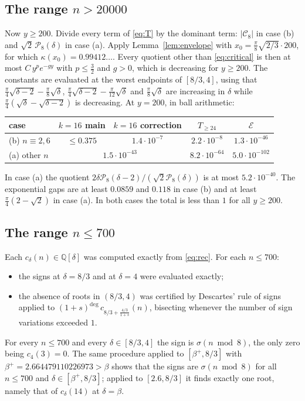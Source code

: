 \documentclass[11pt]{amsart}
\theoremstyle{remark}
\theoremstyle{definition}
\newcommand{\Q}{\mathbb Q}
\newcommand{\cP}{\mathcal P}
\newcommand{\cE}{\mathcal E}
\begin{document}
\subsection{The range \texorpdfstring{$n>20000$}{n > 20000}}\label{sec:tail}
Now $y\ge200$. Divide every term of \eqref{eq:T} by the dominant term: $|\mathcal C_8|$ in case (b) and $\sqrt2\,\cP_8(\delta)$ in case (a). Apply Lemma~\ref{lem:envelope} with $x_0=\frac\pi8\sqrt{2/3}\cdot200$, for which $\kappa(x_0)=0.99412\ldots$. Every quotient other than \eqref{eq:critical} is then at most $C\,y^pe^{-gy}$ with $p\le\frac32$ and $g>0$, which is decreasing for $y\ge200$. The constants are evaluated at the worst endpoints of $[8/3,4]$, using that $\frac\pi4\sqrt{\delta-2}-\frac\pi8\sqrt\delta$, $\frac\pi4\sqrt{\delta-2}-\frac\pi{12}\sqrt\delta$ and $\frac\pi8\sqrt\delta$ are increasing in $\delta$ while $\frac\pi4(\sqrt\delta-\sqrt{\delta-2})$ is decreasing. At $y=200$, in ball arithmetic:
\begin{center}
\begin{tabular}{lcccc}
\toprule
case & $k=16$ main & $k=16$ correction & $T_{\ge24}$ & $\cE$\\
\midrule
(b) $n\equiv2,6$ & $\le0.375$ & $1.4\cdot10^{-7}$ & $2.2\cdot10^{-8}$ & $1.3\cdot10^{-46}$\\
(a) other $n$ & \multicolumn{2}{c}{$1.5\cdot10^{-43}$} & $8.2\cdot10^{-64}$ & $5.0\cdot10^{-102}$\\
\bottomrule
\end{tabular}
\end{center}
In case (a) the quotient $2\delta\cP_8(\delta-2)/(\sqrt2\cP_8(\delta))$ is at most $5.2\cdot10^{-40}$. The exponential gaps are at least $0.0859$ and $0.118$ in case (b) and at least $\frac\pi4(2-\sqrt2)$ in case (a). In both cases the total is less than $1$ for all $y\ge200$.

\subsection{The range \texorpdfstring{$n\le700$}{n <= 700}}\label{sec:finite}
Each $c_\delta(n)\in\Q[\delta]$ was computed exactly from \eqref{eq:rec}. For each $n\le700$:
\begin{itemize}[leftmargin=2em]
\item the signs at $\delta=8/3$ and at $\delta=4$ were evaluated exactly;
\item the absence of roots in $(8/3,4)$ was certified by Descartes' rule of signs applied to $(1+s)^{\deg}\,c_{8/3+\frac{4/3}{1+s}}(n)$, bisecting whenever the number of sign variations exceeded $1$.
\end{itemize}
For every $n\le700$ and every $\delta\in[8/3,4]$ the sign is $\sigma(n\bmod8)$, the only zero being $c_4(3)=0$. The same procedure applied to $[\beta^+,8/3]$ with $\beta^+=2.664479110226973>\beta$ shows that the signs are $\sigma(n\bmod8)$ for all $n\le700$ and $\delta\in[\beta^+,8/3]$; applied to $[2.6,8/3]$ it finds exactly one root, namely that of $c_\delta(14)$ at $\delta=\beta$.
\end{document}

